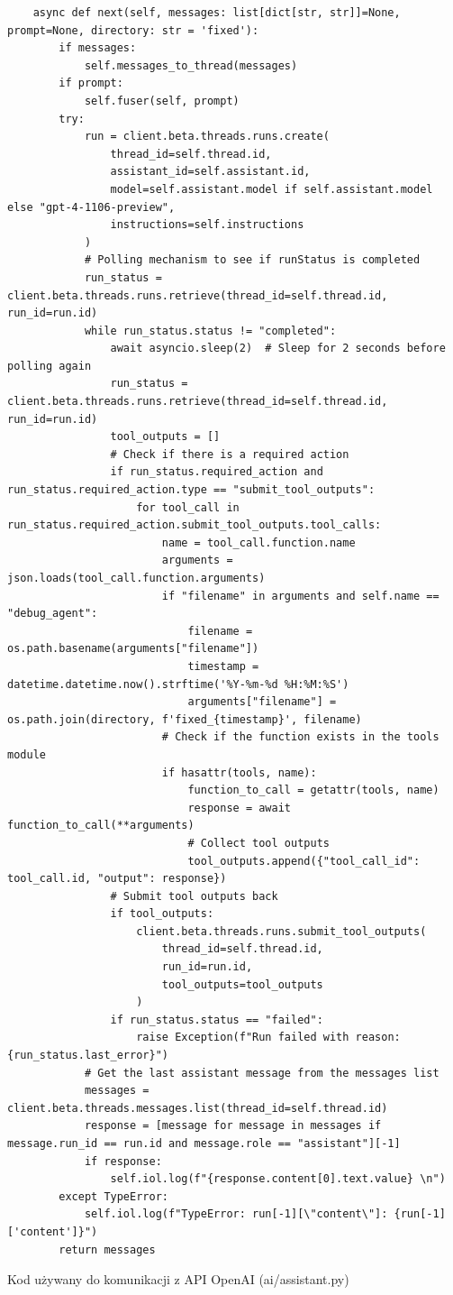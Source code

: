 \begin{listing}
\begin{verbatim}
    async def next(self, messages: list[dict[str, str]]=None, prompt=None, directory: str = 'fixed'):
        if messages:
            self.messages_to_thread(messages)
        if prompt:
            self.fuser(self, prompt)
        try:
            run = client.beta.threads.runs.create(
                thread_id=self.thread.id,
                assistant_id=self.assistant.id,
                model=self.assistant.model if self.assistant.model else "gpt-4-1106-preview",
                instructions=self.instructions
            )
            # Polling mechanism to see if runStatus is completed
            run_status = client.beta.threads.runs.retrieve(thread_id=self.thread.id, run_id=run.id)
            while run_status.status != "completed":
                await asyncio.sleep(2)  # Sleep for 2 seconds before polling again
                run_status = client.beta.threads.runs.retrieve(thread_id=self.thread.id, run_id=run.id)
                tool_outputs = []
                # Check if there is a required action
                if run_status.required_action and run_status.required_action.type == "submit_tool_outputs":
                    for tool_call in run_status.required_action.submit_tool_outputs.tool_calls:
                        name = tool_call.function.name
                        arguments = json.loads(tool_call.function.arguments)
                        if "filename" in arguments and self.name == "debug_agent": 
                            filename = os.path.basename(arguments["filename"])
                            timestamp = datetime.datetime.now().strftime('%Y-%m-%d %H:%M:%S')
                            arguments["filename"] = os.path.join(directory, f'fixed_{timestamp}', filename)
                        # Check if the function exists in the tools module
                        if hasattr(tools, name):
                            function_to_call = getattr(tools, name)
                            response = await function_to_call(**arguments)
                            # Collect tool outputs
                            tool_outputs.append({"tool_call_id": tool_call.id, "output": response})
                # Submit tool outputs back
                if tool_outputs:
                    client.beta.threads.runs.submit_tool_outputs(
                        thread_id=self.thread.id,
                        run_id=run.id,
                        tool_outputs=tool_outputs
                    )
                if run_status.status == "failed":
                    raise Exception(f"Run failed with reason: {run_status.last_error}")
            # Get the last assistant message from the messages list
            messages = client.beta.threads.messages.list(thread_id=self.thread.id)
            response = [message for message in messages if message.run_id == run.id and message.role == "assistant"][-1]
            if response:
                self.iol.log(f"{response.content[0].text.value} \n")
        except TypeError:
            self.iol.log(f"TypeError: run[-1][\"content\"]: {run[-1]['content']}")
        return messages
    \end{verbatim}
    \caption{Kod używany do komunikacji z API OpenAI (ai/assistant.py)}
    \label{listing:api_openai}
\end{listing}
